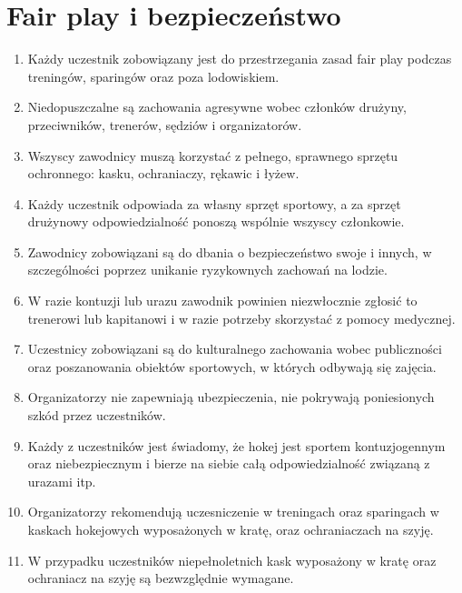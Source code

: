 \documentclass[12pt,a4paper]{article}
\let\stdsection\section
\renewcommand\section{\clearpage\stdsection}
\begin{document}
\section{Fair play i bezpieczeństwo}
\begin{enumerate}
  \item Każdy uczestnik zobowiązany jest do przestrzegania zasad fair play podczas treningów, sparingów oraz poza lodowiskiem.
  \item Niedopuszczalne są zachowania agresywne wobec członków drużyny, przeciwników, trenerów, sędziów i organizatorów.
  \item Wszyscy zawodnicy muszą korzystać z pełnego, sprawnego sprzętu ochronnego: kasku, ochraniaczy, rękawic i łyżew.
  \item Każdy uczestnik odpowiada za własny sprzęt sportowy, a za sprzęt drużynowy odpowiedzialność ponoszą wspólnie wszyscy członkowie.
  \item Zawodnicy zobowiązani są do dbania o bezpieczeństwo swoje i innych, w szczególności poprzez unikanie ryzykownych zachowań na lodzie.
  \item W razie kontuzji lub urazu zawodnik powinien niezwłocznie zgłosić to trenerowi lub kapitanowi i w razie potrzeby skorzystać z pomocy medycznej.
  \item Uczestnicy zobowiązani są do kulturalnego zachowania wobec publiczności oraz poszanowania obiektów sportowych, w których odbywają się zajęcia.
  \item Organizatorzy nie zapewniają ubezpieczenia, nie pokrywają poniesionych szkód przez uczestników.
  \item Każdy z uczestników jest świadomy, że hokej jest sportem kontuzjogennym oraz niebezpiecznym i bierze na siebie całą odpowiedzialność związaną z urazami itp.
  \item Organizatorzy rekomendują uczesniczenie w treningach oraz sparingach w kaskach hokejowych wyposażonych w kratę, oraz ochraniaczach na szyję.
  \item W przypadku uczestników niepełnoletnich kask wyposażony w kratę oraz ochraniacz na szyję są bezwzględnie wymagane.
\end{enumerate}
\end{document}
